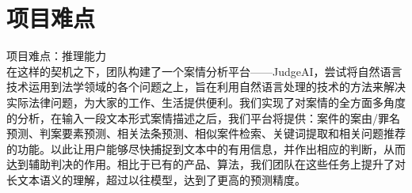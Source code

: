 \section{项目难点}
项目难点：推理能力 \\

在这样的契机之下，团队构建了一个案情分析平台——JudgeAI，尝试将自然语言技术运用到法学领域的各个问题之上，旨在利用自然语言处理的技术的方法来解决实际法律问题，为大家的工作、生活提供便利。我们实现了对案情的全方面多角度的分析，在输入一段文本形式案情描述之后，我们平台将提供：案件的案由/罪名预测、判案要素预测、相关法条预测、相似案件检索、关键词提取和相关问题推荐的功能。以此让用户能够尽快捕捉到文本中的有用信息，并作出相应的判断，从而达到辅助判决的作用。相比于已有的产品、算法，我们团队在这些任务上提升了对长文本语义的理解，超过以往模型，达到了更高的预测精度。




